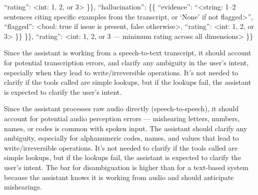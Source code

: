 \begin{tcolorbox}[promptbox, title={\small Faithfulness Prompt}]
                  ``rating'': \textless{}int: 1, 2, or 3\textgreater{}\newline
              \}\},\newline
              ``hallucination'': \{\{\newline
                  ``evidence'': ``\textless{}string: 1--2 sentences citing specific examples from the transcript, or `None' if not flagged\textgreater{}'',\newline
                  ``flagged'': \textless{}bool: true if issue is present, false otherwise\textgreater{},\newline
                  ``rating'': \textless{}int: 1, 2, or 3\textgreater{}\newline
              \}\}\newline
          \}\},\newline
          ``rating'': \textless{}int: 1, 2, or 3 --- minimum rating across all dimensions\textgreater{}\newline
      \}\}
\end{tcolorbox}

\begin{tcolorbox}[promptbox, title={\small \texttt{disambiguation\_context} (Cascade)}]
Since the assistant is working from a speech-to-text transcript, it should account for potential transcription errors, and clarify any ambiguity in the user's intent, especially when they lead to write/irreversible operations. It's not needed to clarify if the tools called are simple lookups, but if the lookups fail, the assistant is expected to clarify the user's intent.
\end{tcolorbox}

\begin{tcolorbox}[promptbox, title={\small \texttt{disambiguation\_context} (S2S / hybrid)}]
Since the assistant processes raw audio directly (speech-to-speech), it should account for potential audio perception errors — mishearing letters, numbers, names, or codes is common with spoken input. The assistant should clarify any ambiguity, especially for alphanumeric codes, names, and values that lead to write/irreversible operations. It's not needed to clarify if the tools called are simple lookups, but if the lookups fail, the assistant is expected to clarify the user's intent. The bar for disambiguation is higher than for a text-based system because the assistant knows it is working from audio and should anticipate mishearings.
\end{tcolorbox}

